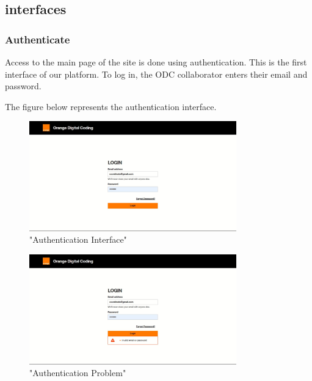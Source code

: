 \subsection{interfaces}
\newpage
\subsubsection{Authenticate}

Access to the main page of the site is done using authentication. This is the first interface of our platform. To log in, the ODC collaborator enters their email and password.

The figure below represents the authentication interface.

\begin{figure}[h!]
    \centering
    \includegraphics[width=0.8\textwidth]{images/login.JPG}
    \caption{"Authentication Interface"}
    \label{fig:"Authentication Interface"}
\end{figure}


\begin{figure}[h!]
    \centering
    \includegraphics[width=0.8\textwidth]{images/loginerr.JPG}
    \caption{"Authentication Problem"}
    \label{fig:"Authentication Problem"}
\end{figure}
\newpage
